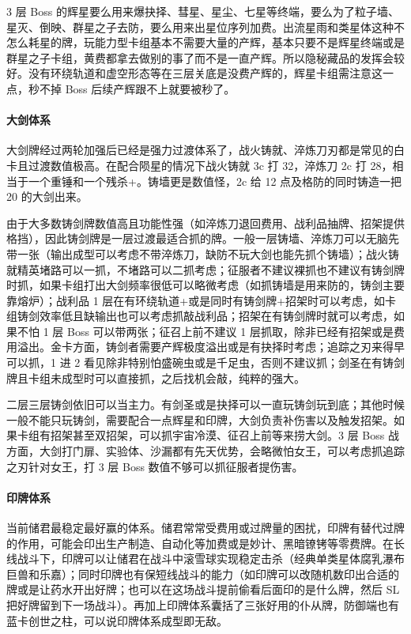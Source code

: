 \documentclass[12pt, a4paper]{article}
\begin{document}
3 层 Boss 的辉星要么用来爆抉择、彗星、星尘、七星等终端，要么为了粒子墙、星灭、倒映、群星之子去防，要么用来出星位序列加费。出流星雨和类星体这种不怎么耗星的牌，玩能力型卡组基本不需要大量的产辉，基本只要不是辉星终端或是群星之子卡组，黄费都拿去做别的事了而不是一直产辉。所以隐秘藏品的发挥会较好。没有环绕轨道和虚空形态等在三层关底是没费产辉的，辉星卡组需注意这一点，秒不掉 Boss 后续产辉跟不上就要被秒了。

\paragraph{大剑体系}
大剑牌经过两轮加强后已经是强力过渡体系了，战火铸就、淬炼刀刃都是常见的白卡且过渡数值极高。在配合陨星的情况下战火铸就 3c 打 32，淬炼刀 2c 打 28，相当于一个重锤和一个残杀+。铸墙更是数值怪，2c 给 12 点及格防的同时铸造一把 20 的大剑出来。

由于大多数铸剑牌数值高且功能性强（如淬炼刀退回费用、战利品抽牌、招架提供格挡），因此铸剑牌是一层过渡最适合抓的牌。一般一层铸墙、淬炼刀可以无脑先带一张（输出成型可以考虑不带淬炼刀，缺防不玩大剑也能先抓个铸墙）；战火铸就精英堵路可以一抓，不堵路可以二抓考虑；征服者不建议裸抓也不建议有铸剑牌时抓，如果卡组打出大剑频率很低可以略微考虑（如抓铸墙是用来防的，铸剑主要靠熔炉）；战利品 1 层在有环绕轨道+或是同时有铸剑牌+招架时可以考虑，如卡组铸剑效率低且缺输出也可以考虑抓敲战利品；招架在有铸剑牌时就可以考虑，如果不怕 1 层 Boss 可以带两张；征召上前不建议 1 层抓取，除非已经有招架或是费用溢出。金卡方面，铸剑者需要产辉极度溢出或是有抉择时考虑；追踪之刃来得早可以抓，1 进 2 看见除非特别怕盛碗虫或是千足虫，否则不建议抓；剑圣在有铸剑牌且卡组未成型时可以直接抓，之后找机会敲，纯粹的强大。

二层三层铸剑依旧可以当主力。有剑圣或是抉择可以一直玩铸剑玩到底；其他时候一般不能只玩铸剑，需要配合一点辉星和印牌，大剑负责补伤害以及触发招架。如果卡组有招架甚至双招架，可以抓宇宙冷漠、征召上前等来捞大剑。3 层 Boss 战方面，大剑打门扉、实验体、沙漏都有先天优势，会略微怕女王，可以考虑抓追踪之刃针对女王，打 3 层 Boss 数值不够可以抓征服者提伤害。

\paragraph{印牌体系}
当前储君最稳定最好赢的体系。储君常常受费用或过牌量的困扰，印牌有替代过牌的作用，可能会印出生产制造、自动化等加费或是妙计、黑暗镣铐等零费牌。在长线战斗下，印牌可以让储君在战斗中滚雪球实现稳定击杀（经典单类星体腐乳瀑布巨兽和乐嘉）；同时印牌也有保短线战斗的能力（如印牌可以改随机数印出合适的牌或是让药水开出好牌；也可以在这场战斗提前偷看后面印的是什么牌，然后 SL 把好牌留到下一场战斗）。再加上印牌体系囊括了三张好用的仆从牌，防御端也有蓝卡创世之柱，可以说印牌体系成型即无敌。
\end{document}

